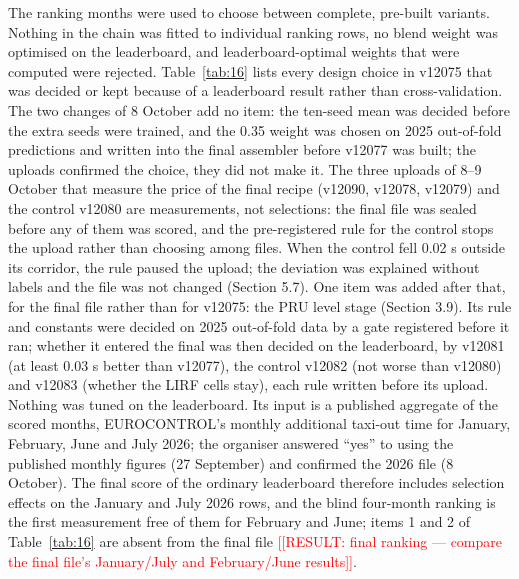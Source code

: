 \documentclass[
  manuscript=article,  %
  layout=preprint,     %
  year=2026,
  volume=4,
]{extra/joas}
\newcommand{\placeholder}[1]{\textcolor{red}{[[RESULT:#1]]}}
\begin{document}
The ranking months were used to choose between complete, pre-built variants. Nothing in the chain was fitted to individual ranking rows, no blend weight was optimised on the leaderboard, and leaderboard-optimal weights that were computed were rejected. Table~\ref{tab:16} lists every design choice in v12075 that was decided or kept because of a leaderboard result rather than cross-validation. The two changes of 8 October add no item: the ten-seed mean was decided before the extra seeds were trained, and the 0.35 weight was chosen on 2025 out-of-fold predictions and written into the final assembler before v12077 was built; the uploads confirmed the choice, they did not make it. The three uploads of 8--9 October that measure the price of the final recipe (v12090, v12078, v12079) and the control v12080 are measurements, not selections: the final file was sealed before any of them was scored, and the pre-registered rule for the control stops the upload rather than choosing among files. When the control fell 0.02 s outside its corridor, the rule paused the upload; the deviation was explained without labels and the file was not changed (Section 5.7). One item was added after that, for the final file rather than for v12075: the PRU level stage (Section 3.9). Its rule and constants were decided on 2025 out-of-fold data by a gate registered before it ran; whether it entered the final was then decided on the leaderboard, by v12081 (at least 0.03 s better than v12077), the control v12082 (not worse than v12080) and v12083 (whether the LIRF cells stay), each rule written before its upload. Nothing was tuned on the leaderboard. Its input is a published aggregate of the scored months, EUROCONTROL's monthly additional taxi-out time for January, February, June and July 2026; the organiser answered ``yes'' to using the published monthly figures (27 September) and confirmed the 2026 file (8 October). The final score of the ordinary leaderboard therefore includes selection effects on the January and July 2026 rows, and the blind four-month ranking is the first measurement free of them for February and June; items 1 and 2 of Table~\ref{tab:16} are absent from the final file \placeholder{ final ranking --- compare the final file's January/July and February/June results}.
\end{document}
